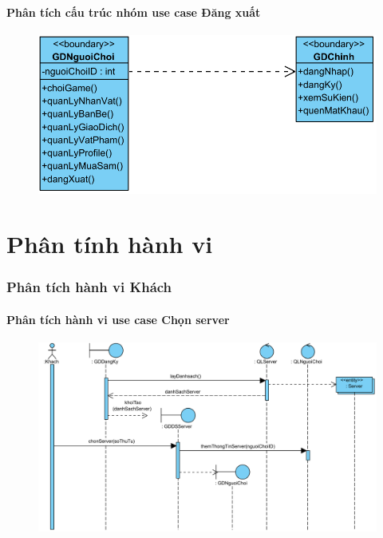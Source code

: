\documentclass[3p]{elsarticle}
\begin{document}
\subsection{Phân tích cấu trúc nhóm use case Đăng xuất}
\begin{figure}[!htbp]
	\hspace*{-.5in}
	\centering
	\includegraphics[scale=.55]{images/structure-pdfs/gamer/Logout.pdf}
\end{figure}
\newpage






\part{Phân tính hành vi}
\section{Phân tích hành vi Khách}
\subsection{Phân tích hành vi use case Chọn server}
\begin{figure}[!htbp]
	\hspace*{-.5in}
	\centering
	\includegraphics[scale=.55]{images/sequence-pdfs/guest/chonServer.pdf}
\end{figure}
\newpage
\end{document}
